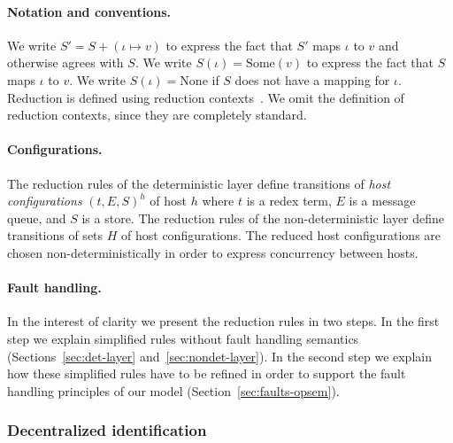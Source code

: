 \documentclass[preprint]{sigplanconf}
\theoremstyle{definition}
\theoremstyle{definition}
\begin{document}
\paragraph{Notation and conventions.} We write $S' = S + (\iota \mapsto v)$ to express the fact that $S'$ maps $\iota$ to $v$ and otherwise agrees with $S$. We write $S(\iota) = \text{Some}(v)$ to express the fact that $S$ maps $\iota$ to $v$. We write $S(\iota) = \text{None}$ if $S$ does not have a mapping for $\iota$. Reduction is defined using reduction contexts~\cite{TAPL}. We omit the definition of reduction contexts, since they are completely standard.

\paragraph{Configurations.} The reduction rules of the deterministic layer define transitions of \emph{host configurations} $(t, E, S)^h$ of host $h$ where $t$ is a redex term, $E$ is a message queue, and $S$ is a store. The reduction rules of the non-deterministic layer define transitions of sets $H$ of host configurations. The reduced host configurations are chosen non-deterministically in order to express concurrency between hosts.

\paragraph{Fault handling.} In the interest of clarity we present the reduction rules in two steps. In the first step we explain simplified rules without fault handling semantics (Sections~\ref{sec:det-layer} and~\ref{sec:nondet-layer}). In the second step we explain how these simplified rules have to be refined in order to support the fault handling principles of our model (Section~\ref{sec:faults-opsem}).


\subsubsection{Decentralized identification}
\end{document}
